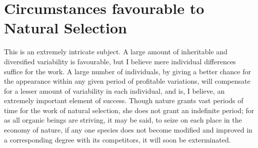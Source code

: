 \section{Circumstances favourable to Natural Selection}
\indent This is an extremely intricate subject. A large amount of inheritable and diversified variability is favourable, but I believe mere individual differences suffice for the work. A large number of individuals, by giving a better chance for the appearance within any given period of profitable variations, will compensate for a lesser amount of variability in each individual, and is, I believe, an extremely important element of success. Though nature grants vast periods of time for the work of natural selection, she does not grant an indefinite period; for as all organic beings are striving, it may be said, to seize on each place in the economy of nature, if any one species does not become modified and improved in a corresponding degree with its competitors, it will soon be exterminated. \\
